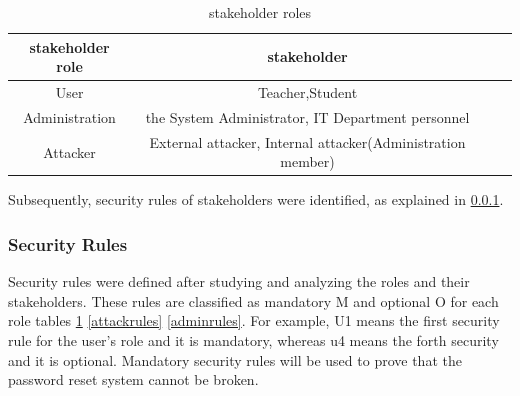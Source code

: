 \begin{table}[!htbp]         %
	\begin{center}
\begin{tabular}{|c|c|c|c|}
\hline 
 \textbf{stakeholder role} & \textbf{stakeholder} \\ 
\hline  
 User & Teacher,Student \\ 
\hline
 Administration &  the System Administrator, IT Department personnel
 \\ 
\hline 
 Attacker & External attacker, Internal attacker(Administration member) \\  
\hline 
	\end{tabular}
	\end{center}
	\caption{ stakeholder roles }
\label{Userrules}
\end{table} 

 Subsequently, security rules  of  stakeholders were identified, as explained in \ref{Secrules}.



\subsubsection{Security Rules}\label{Secrules}
Security rules were defined after studying and analyzing the roles
and their stakeholders. These rules are classified as mandatory M
and optional O for each role tables \ref{Userrules} \ref{attackrules}
\ref{adminrules}. For example, U1 means   the first security rule for the
user's role and it is mandatory, whereas  u4  means the forth security
and it is optional. Mandatory security rules will be used to prove that
the password reset system cannot be broken.

